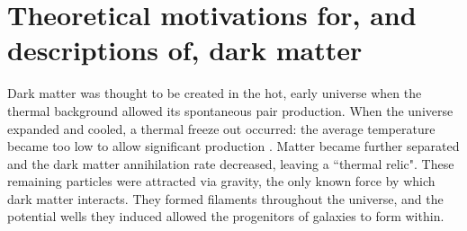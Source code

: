 

\section{Theoretical motivations for, and descriptions of, dark matter}
\label{sec:dark_matter}

\iffalse

Dark matter was thought to be created in the hot, early universe when the thermal background allowed its spontaneous pair production. When the universe expanded and cooled, a thermal freeze out occurred: the average temperature became too low to allow significant production \cite{Baldes:2017gzw}. Matter became further separated and the dark matter annihilation rate decreased, leaving a ``thermal relic". These remaining particles were attracted via gravity, the only known force by which dark matter interacts. They formed filaments throughout the universe, and the potential wells they induced allowed the progenitors of galaxies to form within.

